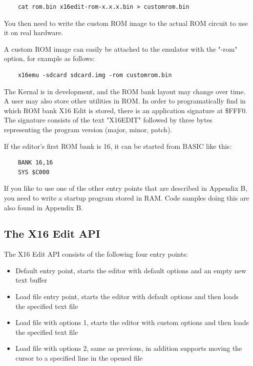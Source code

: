 \documentclass{article}
\begin{document}
\begin{verbatim}
    cat rom.bin x16edit-rom-x.x.x.bin > customrom.bin
\end{verbatim}

        You then need to write the custom ROM image to the actual ROM circuit to use it on
        real hardware.

        A custom ROM image can easily be attached to the emulator with
        the "-rom" option, for example as follows:

\begin{verbatim}
    x16emu -sdcard sdcard.img -rom customrom.bin
\end{verbatim}

    The Kernal is in development, and the ROM bank layout may change over time. A user
    may also store other utilities in ROM. In order to programatically find in which
    ROM bank X16 Edit is stored, there is an application signature at \$FFF0. The
    signature consists of the text "X16EDIT" followed by three bytes representing
    the program version (major, minor, patch).
        
    If the editor's first ROM bank is 16, it can be started from BASIC like this:

\begin{verbatim}
    BANK 16,16
    SYS $C000
\end{verbatim}

        If you like to use one of the other entry points that are described in Appendix B,
        you need to write a startup program stored in RAM. Code samples doing this
        are also found in Appendix B.

    \subsection{The X16 Edit API}
        The X16 Edit API consists of the following four entry points:

        \begin{itemize}
            \item Default entry point, starts the editor with default options and an empty new text buffer
            \item Load file entry point, starts the editor with default options and then loads the specified text file
            \item Load file with options 1, starts the editor with custom options and then loads the specified text file
            \item Load file with options 2, same as previous, in addition supports moving the cursor to a specified line in the opened file
        \end{itemize}
\end{document}
